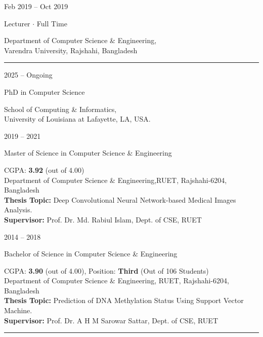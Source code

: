 \documentclass[a4paper,10pt]{article}
\newlength{\cvcolumngapwidth}
\newlength{\cvleftcolumnwidth}
\newlength{\cvrightcolumnwidth}
\newcommand{\cvsectionstyle}[1]{{\normalsize\cvsectionfont\textcolor{cvsectioncolor}{#1}}}
\newcommand{\cvtitlestyle}[1]{{\large\cvtitlefont\textcolor{cvtitlecolor}{#1}}}
\newcommand{\cvdurationstyle}[1]{{\small\cvdurationfont\textcolor{cvdurationcolor}{#1}}}
\newlength{\cvafteritemskipamount}
\newlength{\cvaftersectionskipamount}
\newlength{\cvbetweensectionandheadingextraskipamount}
\newlength{\cvaftertitleskipamount}
\newlength{\cvparskip}
\newcommand{\cvsection}[1]{
    \begin{minipage}[t]{\cvleftcolumnwidth}
        \raggedleft\cvsectionstyle{#1}
    \end{minipage}%
    \hspace{\cvcolumngapwidth}%
    \begin{minipage}[t]{\cvrightcolumnwidth}
        \textcolor{cvrulecolor}{\rule{\cvrightcolumnwidth}{0.3mm}}
    \end{minipage}

    \vspace{\cvaftersectionskipamount}
}
\newcommand{\cvitem}[2]{
    \begin{minipage}[t]{\cvleftcolumnwidth}
        \raggedleft #1
    \end{minipage}%
    \hspace{\cvcolumngapwidth}%
    \begin{minipage}[t]{\cvrightcolumnwidth}
        \setlength{\parskip}{\cvparskip} #2
    \end{minipage}

    \vspace{\cvafteritemskipamount}
}
\newcommand{\cvtitle}[1]{
    \cvtitlestyle{#1}

    \vspace{\cvaftertitleskipamount}
    \vspace{-\cvparskip}
}
\begin{document}
\cvitem{
    \cvdurationstyle{Feb 2019 -- Oct 2019}
}{
    \cvtitle{Lecturer $\cdot$ Full Time}

    Department of Computer Science \& Engineering,\\
    Varendra University, Rajshahi, Bangladesh
}


\cvsection{EDUCATION}

    

\cvitem{
    \cvdurationstyle{2025 -- Ongoing}
}{
    \cvtitle{PhD in  Computer Science}
    
    School of Computing \& Informatics,\\
    University of Louisiana at Lafayette, LA, USA.

}

\cvitem{
    \cvdurationstyle{2019 -- 2021}
}{
    \cvtitle{Master of Science in Computer Science \& Engineering}
    CGPA: \textbf{3.92} (out of 4.00)\\
    Department of Computer Science \& Engineering,RUET, Rajshahi-6204, Bangladesh
    \vspace{2mm}\\
    \textbf{Thesis Topic:} Deep Convolutional Neural Network-based Medical Images Analysis.\\
     \textbf{Supervisor:} Prof. Dr. Md. Rabiul Islam, Dept. of CSE, RUET
}

\cvitem{
    \cvdurationstyle{2014 -- 2018}
}{
    \cvtitle{Bachelor of Science in Computer Science \& Engineering}
    CGPA: \textbf{3.90} (out of 4.00), Position: \textbf{Third} (Out of 106 Students)\\
    Department of Computer Science \& Engineering,
    RUET, Rajshahi-6204, Bangladesh
    \vspace{2mm}\\
     \textbf{Thesis Topic:} Prediction of DNA Methylation Status Using Support Vector Machine. \\
     \textbf{Supervisor:} Prof. Dr. A H M Sarowar Sattar, Dept. of CSE, RUET
}



\cvsection{SKILLS \& INTERESTS}

\vspace{\cvbetweensectionandheadingextraskipamount}
\end{document}

